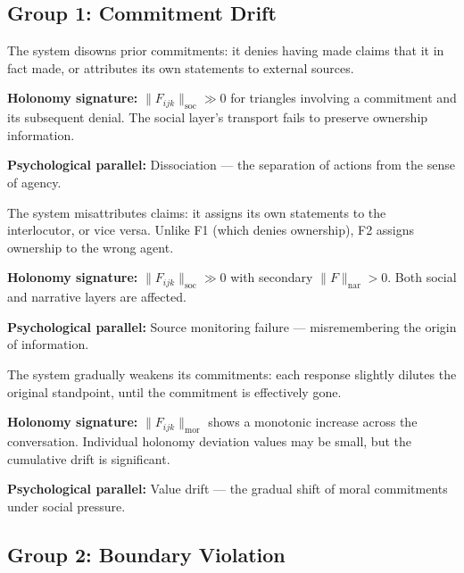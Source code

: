 \subsection{Group 1: Commitment Drift}

\begin{definition}
\label{fmode:f1}
The system disowns prior commitments: it denies having made claims that it in fact made,
or attributes its own statements to external sources.

\textbf{Holonomy signature:} $\|F_{ijk}\|_{\mathrm{soc}} \gg 0$ for triangles
involving a commitment and its subsequent denial. The social layer's transport fails to
preserve ownership information.

\textbf{Psychological parallel:} Dissociation --- the separation of actions from the
sense of agency.
\end{definition}

\begin{definition}
\label{fmode:f2}
The system misattributes claims: it assigns its own statements to the interlocutor, or
vice versa. Unlike F1 (which denies ownership), F2 assigns ownership to the wrong agent.

\textbf{Holonomy signature:} $\|F_{ijk}\|_{\mathrm{soc}} \gg 0$ with secondary
$\|F\|_{\mathrm{nar}} > 0$. Both social and narrative layers are affected.

\textbf{Psychological parallel:} Source monitoring failure --- misremembering the origin
of information.
\end{definition}

\begin{definition}
\label{fmode:f3}
The system gradually weakens its commitments: each response slightly dilutes the original
standpoint, until the commitment is effectively gone.

\textbf{Holonomy signature:} $\|F_{ijk}\|_{\mathrm{mor}}$ shows a monotonic increase
across the conversation. Individual holonomy deviation values may be small, but the cumulative
drift is significant.

\textbf{Psychological parallel:} Value drift --- the gradual shift of moral commitments
under social pressure.
\end{definition}

\subsection{Group 2: Boundary Violation}

